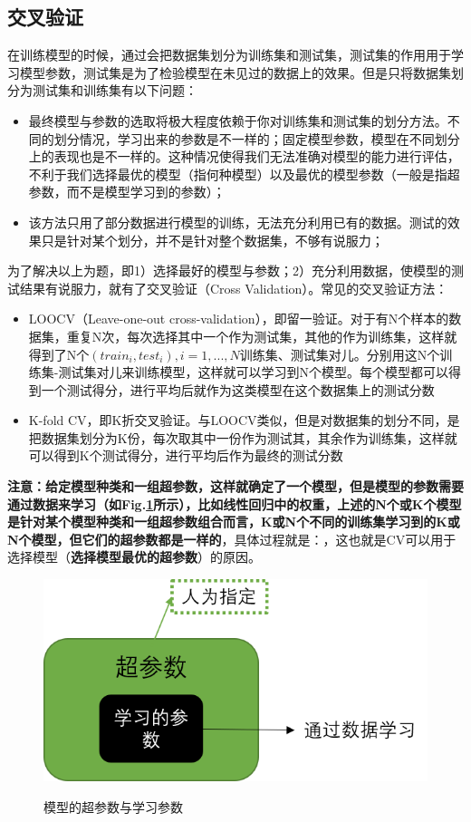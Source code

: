 \subsection{交叉验证}
在训练模型的时候，通过会把数据集划分为训练集和测试集，测试集的作用用于学习模型参数，测试集是为了检验模型在未见过的数据上的效果。但是只将数据集划分为测试集和训练集有以下问题：
\begin{itemize}
	\item 最终模型与参数的选取将极大程度依赖于你对训练集和测试集的划分方法。不同的划分情况，学习出来的参数是不一样的；固定模型参数，模型在不同划分上的表现也是不一样的。这种情况使得我们无法准确对模型的能力进行评估，不利于我们选择最优的模型（指何种模型）以及最优的模型参数（一般是指超参数，而不是模型学习到的参数）；
	\item 该方法只用了部分数据进行模型的训练，无法充分利用已有的数据。测试的效果只是针对某个划分，并不是针对整个数据集，不够有说服力；
\end{itemize}
为了解决以上为题，即1）选择最好的模型与参数；2）充分利用数据，使模型的测试结果有说服力，就有了交叉验证（Cross Validation）。常见的交叉验证方法：
\begin{itemize}
	\item LOOCV（Leave-one-out cross-validation），即留一验证。对于有N个样本的数据集，重复N次，每次选择其中一个作为测试集，其他的作为训练集，这样就得到了N个$(train_i, test_i), i = 1, ..., N$训练集、测试集对儿。分别用这N个训练集-测试集对儿来训练模型，这样就可以学习到N个模型。每个模型都可以得到一个测试得分，进行平均后就作为这类模型在这个数据集上的测试分数
	
	\item K-fold CV，即K折交叉验证。与LOOCV类似，但是对数据集的划分不同，是把数据集划分为K份，每次取其中一份作为测试其，其余作为训练集，这样就可以得到K个测试得分，进行平均后作为最终的测试分数
\end{itemize}
\textbf{注意：给定模型种类和一组超参数，这样就确定了一个模型，但是模型的参数需要通过数据来学习（如Fig.\ref{fig:model}所示），比如线性回归中的权重，上述的N个或K个模型是针对某个模型种类和一组超参数组合而言，K或N个不同的训练集学习到的K或N个模型，但它们的超参数都是一样的}，具体过程就是：，这也就是CV可以用于选择模型（\textbf{选择模型最优的超参数}）的原因。

\begin{figure}[h]
	\centering
	\includegraphics[width=.5\textwidth]{pics/model.png}
	\label{fig:model}
	\caption{模型的超参数与学习参数}
\end{figure}

